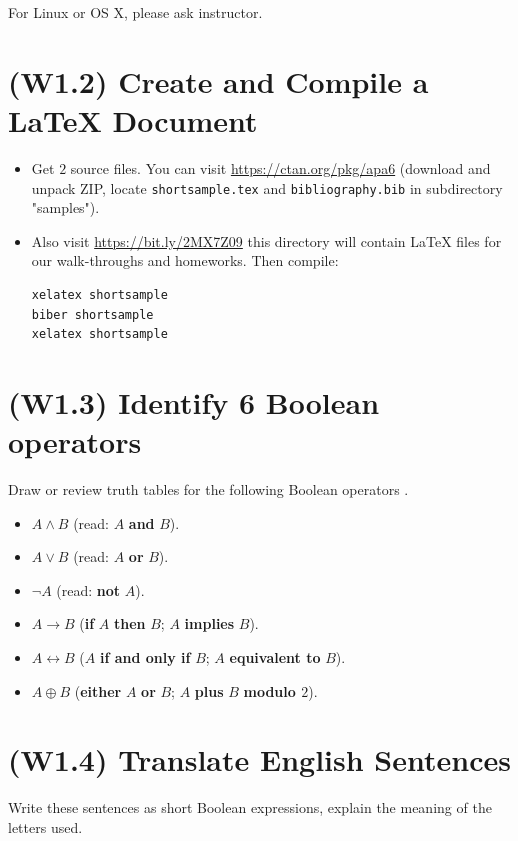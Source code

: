 \documentclass[jou]{apa6}
\begin{document}
For Linux or OS X, please ask instructor.


\section{(W1.2) Create and Compile a LaTeX Document}

\begin{itemize}
\item Get $2$ source files. 
You can visit \url{https://ctan.org/pkg/apa6} (download and
unpack ZIP, locate {\tt shortsample.tex} and 
{\tt bibliography.bib} in subdirectory "samples").
\item Also visit \url{https://bit.ly/2MX7Z09} \textendash
this directory will contain 
LaTeX files for our walk-throughs and homeworks. Then compile:
\begin{verbatim}
xelatex shortsample
biber shortsample
xelatex shortsample
\end{verbatim}
\end{itemize}

\section{(W1.3) Identify 6 Boolean operators}

Draw or review truth tables for the following Boolean operators
\parencite[see][p.4]{Rosen2019}.

\begin{itemize}
\item $A \wedge B$ (read: $A$ {\bf and} $B$).
\item $A \vee B$ (read: $A$ {\bf or} $B$). 
\item $\neg A$ (read: {\bf not} $A$).
\item $A \rightarrow B$ ({\bf if} $A$ {\bf then} $B$;
$A$ {\bf implies} $B$).
\item $A \leftrightarrow B$ ($A$ {\bf if and only if} $B$; 
$A$ {\bf equivalent to} $B$).
\item $A \oplus B$ ({\bf either} $A$ {\bf or} $B$; 
$A$ {\bf plus} $B$ {\bf modulo $2$}).
\end{itemize}



\section{(W1.4) Translate English Sentences}

Write these sentences as short Boolean expressions, 
explain the meaning of the letters used.
\end{document}
